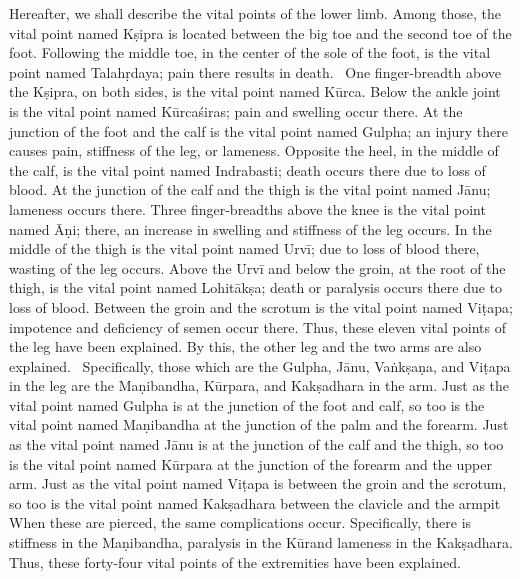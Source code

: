 \begin{translation}
\begin{tt}
Hereafter, we shall describe the vital points of the lower limb.
Among those, the vital point named Kṣipra is located between the big toe and the second toe of the foot.
Following the middle toe, in the center of the sole of the foot, is the vital point named Talahṛdaya; pain there results in death. 
One finger-breadth above the Kṣipra, on both sides, is the vital point named Kūrca.
Below the ankle joint is the vital point named Kūrcaśiras; pain and swelling occur there.
At the junction of the foot and the calf is the vital point named Gulpha; an injury there causes pain, stiffness of the leg, or lameness.
Opposite the heel, in the middle of the calf, is the vital point named Indrabasti; death occurs there due to loss of blood.
At the junction of the calf and the thigh is the vital point named Jānu; lameness occurs there.
Three finger-breadths above the knee is the vital point named Āṇi; there, an increase in swelling and stiffness of the leg occurs.
In the middle of the thigh is the vital point named Urvī; due to loss of blood there, wasting of the leg occurs.
Above the Urvī and below the groin, at the root of the thigh, is the vital point named Lohitākṣa; death or paralysis occurs there due to loss of blood.
Between the groin and the scrotum is the vital point named Viṭapa; impotence and deficiency of semen occur there.
Thus, these eleven vital points of the leg have been explained.
By this, the other leg and the two arms are also explained. 
Specifically, those which are the Gulpha, Jānu, Vaṅkṣaṇa, and Viṭapa in the leg are the Maṇibandha, Kūrpara, and Kakṣadhara in the arm.
Just as the vital point named Gulpha is at the junction of the foot and calf,
so too is the vital point named Maṇibandha at the junction of the palm and the forearm.
Just as the vital point named Jānu is at the junction of the calf and the thigh,
so too is the vital point named Kūrpara at the junction of the forearm and the upper arm.
Just as the vital point named Viṭapa is between the groin and the scrotum,
so too is the vital point named Kakṣadhara between the clavicle and the armpit
When these are pierced, the same complications occur.
Specifically, there is stiffness in the Maṇibandha,
paralysis in the Kūrand lameness in the Kakṣadhara.
Thus, these forty-four vital points of the extremities have been explained.


\end{tt}
\end{translation}
